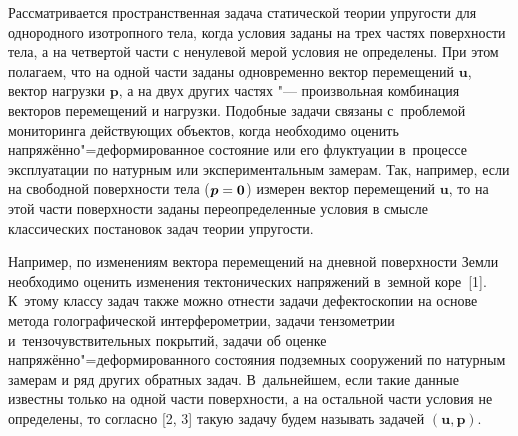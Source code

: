 


\date{18/V/2009} %

\maketitle




Рассматривается пространственная задача статической теории упругости для 
однородного изотропного тела, когда условия заданы на трех частях поверхности
тела, а на четвертой части с ненулевой мерой условия не определены. При этом
полагаем, что на одной части заданы одновременно вектор перемещений $\boldsymbol{u}$, вектор нагрузки $\boldsymbol{p}$, а на двух других частях "--- произвольная комбинация векторов перемещений и нагрузки. 
Подобные задачи связаны с~проблемой мониторинга действующих объектов,
когда необходимо оценить напряжённо"=деформированное состояние или его флуктуации в~процессе  эксплуатации по 
натурным или экспериментальным замерам. 
Так, например, если на свободной поверхности тела ($\boldsymbol{p}=\bf 0$) измерен вектор перемещений $\boldsymbol{u}$, то на этой части поверхности заданы переопределенные условия в смысле классических постановок задач теории упругости.
 
Например, по изменениям вектора перемещений на дневной поверхности Земли  необходимо оценить изменения тектонических напряжений в~земной коре~[1]. 
К~этому классу задач также можно отнести задачи дефектоскопии на основе метода голографической интерферометрии,
задачи тензометрии и~тензочувствительных покрытий,  задачи об  оценке напряжённо"=деформированного состояния подземных сооружений по натурным замерам и ряд  других обратных задач. 
В~дальнейшем, если такие данные известны только на одной части поверхности,  а на остальной части  условия не определены, то согласно [2, 3] такую задачу будем называть задачей $(\boldsymbol{u}, \boldsymbol{p})$.
 
